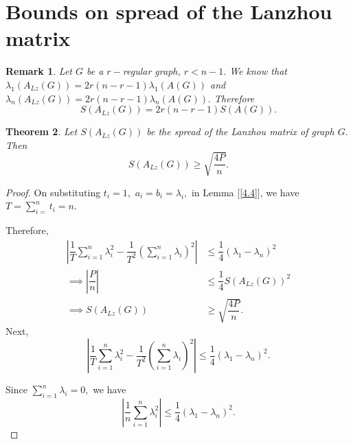 \documentclass[10pt,a4paper,oneside]{article}
\newtheorem{theorem}{Theorem}
\newtheorem{remark}[theorem]{Remark}
\begin{document}
\section{Bounds on spread of the Lanzhou matrix}\label{v}
\begin{remark}
Let $G$ be a $r-$regular graph, $r<n-1.$ 
We know that $\lambda_1(A_{Lz}(G))=2r(n-r-1)\lambda_1(A(G))$
and $\lambda_n(A_{Lz}(G))=2r(n-r-1)\lambda_n(A(G)).$
Therefore $$S(A_{Lz}(G))=2r(n-r-1)S(A(G)).$$
\end{remark}
\begin{theorem}
Let $S(A_{Lz}(G))$ be the spread of the Lanzhou matrix of graph $G.$ Then $$S(A_{Lz}(G))\geq \sqrt{\dfrac{4P}{n}}.$$

\end{theorem}
\begin{proof}
On substituting $t_i=1,$ $a_i=b_i=\lambda_i,$ in Lemma [\ref{4.4}], we have $T=\sum\limits_{i=}^{n} t_i=n.$ 

Therefore,
\begin{align*}
\left\vert\dfrac{1}{T}\sum\limits_{i=1}^{n}\lambda_i^2-\dfrac{1}{T^2}\left(\sum\limits_{i=1}^{n}\lambda_i\right)^2\right\vert & \leq \dfrac{1}{4}(\lambda_1-\lambda_n)^2\\\implies \left\vert \dfrac{P}{n}\right\vert &\leq \dfrac{1}{4}S(A_{Lz}(G))^2\\\implies  S(A_{Lz}(G))&\geq \sqrt{\dfrac{4P}{n}}.
\end{align*}
Next, $$\left\vert\dfrac{1}{T}\sum\limits_{i=1}^{n}\lambda_i^2-\dfrac{1}{T^2}\left(\sum\limits_{i=1}^{n}\lambda_i\right)^2\right\vert  \leq \dfrac{1}{4}(\lambda_1-\lambda_n)^2.$$

Since $\sum\limits_{i=1}^{n}\lambda_i=0,$ we have
$$ \left\vert\dfrac{1}{n}\sum\limits_{i=1}^{n}\lambda_i^2\right\vert  \leq \dfrac{1}{4}(\lambda_1-\lambda_n)^2.$$


\end{proof}
\end{document}
